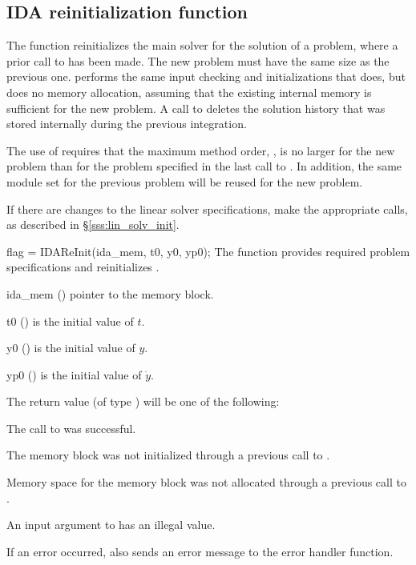 {%

\subsection{IDA reinitialization function}\label{sss:idareinit}

The function  reinitializes the main {\ida} solver for
the solution of a problem, where a prior call to  has
been made. The new problem must have the same size as the previous one.
 performs the same input checking and initializations 
that  does, but does no memory allocation, assuming that the 
existing internal memory is sufficient for the new problem.
A call to  deletes the solution history that was stored
internally during the previous integration.

The use of  requires that the maximum method order,    
, is no larger for the new problem than for the problem  
specified in the last call to .  In addition, the same
{\nvector} module set for the previous problem
will be reused for the new problem.

If there are changes to the linear solver specifications, make the
appropriate  calls, as described in \S\ref{sss:lin_solv_init}.

{
  flag = IDAReInit(ida\_mem, t0, y0, yp0);
}
{
  The function  provides required problem specifications 
  and reinitializes {\ida}.
}
{
  \begin{args}
  \item[ida\_mem] ()
    pointer to the {\ida} memory block.
  \item[t0] ()
    is the initial value of $t$.
  \item[y0] ()
    is the initial value of $y$. 
  \item[yp0] ()
    is the initial value of $\dot{y}$.   
  \end{args}
}
{
  The return value  (of type ) will be one of the following:
  \begin{args}
  \item[\Id{IDA\_SUCCESS}]
    The call to  was successful.
  \item[\Id{IDA\_MEM\_NULL}] 
    The {\ida} memory block was not initialized through a 
    previous call to .
  \item[\Id{IDA\_NO\_MALLOC}] 
    Memory space for the {\ida} memory block was not allocated through a 
    previous call to .
  \item[\Id{IDA\_ILL\_INPUT}] 
    An input argument to  has an illegal value.
  \end{args}
}
{
  If an error occurred,  also sends an error message to the
  error handler function.
}


}
